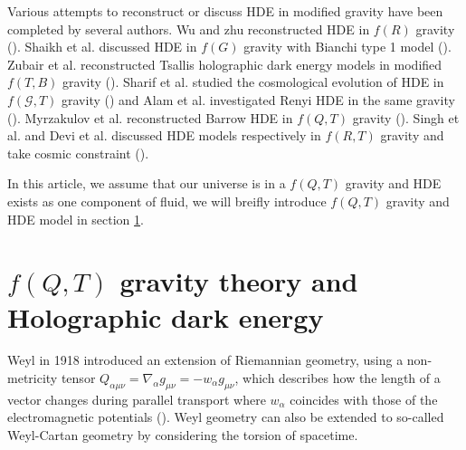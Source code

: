 \documentclass[manuscript]{aastex631}
\begin{document}
Various attempts to reconstruct or discuss HDE in modified gravity have been completed by several authors. Wu and zhu reconstructed HDE in $f(R) $ gravity (\cite{wu_reconstructing_2008}). Shaikh et al. discussed HDE in $f (G)$ gravity with Bianchi type 1 model (\cite{shaikh_holographic_2020}). Zubair et al. reconstructed Tsallis holographic dark energy models in modified $f(T, B)$ gravity (\cite{zubair_reconciling_2021}). Sharif et al. studied the cosmological evolution of HDE in $f(\mathcal{G},T)$ gravity (\cite{sharif_cosmic_2019}) and Alam et al. investigated Renyi HDE in the same gravity (\cite{alam_renyi_2023}). Myrzakulov et al. reconstructed Barrow HDE in $f(Q,T)$ gravity (\cite{myrzakulov_barrow_2024}). Singh et al. and Devi et al. discussed HDE models respectively in $f(R,T)$ gravity and take cosmic constraint (\cite{singh_statefinder_2016,devi_barrow_2024}).


In this article, we assume that our universe is in a $f(Q,T)$ gravity and HDE exists as one component of fluid, we will breifly introduce $f(Q,T)$ gravity and HDE model in section \ref{sec:mghde}.

\section{$f(Q,T)$ gravity theory and Holographic dark energy}\label{sec:mghde}

Weyl in 1918 introduced an extension of Riemannian geometry, using a non-metricity tensor $Q_{\alpha \mu \nu}=\nabla_\alpha g_{\mu \nu}=-w_\alpha g_{\mu \nu}$, which describes how the length of a vector changes during parallel transport where $w_\alpha$ coincides with those of the electromagnetic potentials (\cite{Weyl:1918ib}). Weyl geometry can also be extended to so-called Weyl-Cartan geometry by considering the torsion of spacetime.
\end{document}

